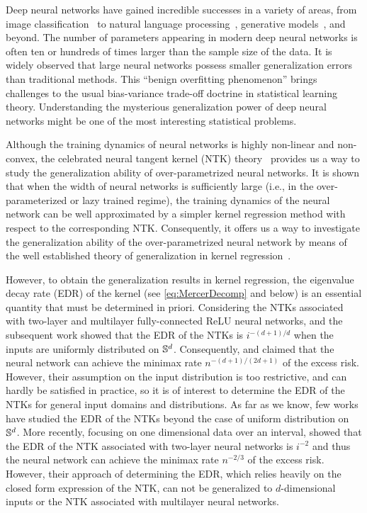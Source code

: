 Deep neural networks have gained incredible successes in a variety of areas,
from image classification~\citep{he2016deep,krizhevsky2017_ImagenetClassification} to natural language processing~\citep{devlin2019_BERTPretraining},
generative models~\citep{karras2019_StylebasedGenerator}, and beyond.
The number of parameters appearing in modern deep neural networks is often ten or hundreds of times larger than the sample size of the data.
It is widely observed that large neural networks possess smaller generalization errors than traditional methods.
This ``benign overfitting phenomenon'' brings challenges to the usual bias-variance trade-off doctrine in statistical learning theory.
Understanding the mysterious generalization power of deep neural networks might be one of the most interesting statistical problems.

Although the training dynamics of neural networks is highly non-linear and non-convex,
the celebrated neural tangent kernel (NTK) theory~\citep{jacot2018_NeuralTangent} provides us a way to study the generalization ability of over-parametrized neural networks.
It is shown that
when the width of neural networks is sufficiently large (i.e., in the over-parameterized or lazy trained regime),
the training dynamics of the neural network can be well approximated by a simpler kernel regression method with respect to the corresponding NTK\@.
Consequently, it offers us a way to investigate the generalization ability of the over-parametrized neural network
by means of the well established theory of generalization in kernel regression~\citep{caponnetto2007_OptimalRates,andreaschristmann2008_SupportVector,lin2018_OptimalRates}.


However, to obtain the generalization results in kernel regression, the eigenvalue decay rate (EDR) of the kernel (see \cref{eq:MercerDecomp} and below) is an essential quantity that must be determined in priori.
Considering the NTKs associated with two-layer and multilayer fully-connected ReLU neural networks,
\citet{bietti2019_InductiveBias} and the subsequent work \citet{bietti2020_DeepEquals} showed that the EDR of the NTKs is $i^{-(d+1)/d}$ when the inputs are uniformly distributed on $\mathbb{S}^d$.
Consequently, \citet{hu2021_RegularizationMatters} and \citet{suh2022_NonparametricRegression} claimed that the neural network can achieve the minimax rate $n^{-(d+1)/(2d+1)}$ of the excess risk.
However, their assumption on the input distribution is too restrictive, and can hardly be satisfied in practice,
so it is of interest to determine the EDR of the NTKs for general input domains and distributions.
As far as we know, few works have studied the EDR of the NTKs beyond the case of uniform distribution on $\mathbb{S}^d$.
More recently, focusing on one dimensional data over an interval,
\citet{lai2023_GeneralizationAbility} showed that the EDR of the NTK associated with two-layer neural networks is $i^{-2}$
and thus the neural network can achieve the minimax rate $n^{-2/3}$ of the excess risk.
However, their approach of determining the EDR, which relies heavily on the closed form expression of the NTK,
can not be generalized to $d$-dimensional inputs or the NTK associated with multilayer neural networks.


